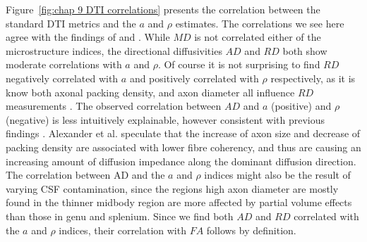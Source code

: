 Figure~\ref{fig:chap 9 DTI correlations} presents the correlation between the standard DTI metrics and the $a$ and $\rho$ estimates. The correlations we see here agree with the findings of \citep{Barazany:2009} and \citep{Alexander:2010}. While $MD$ is not correlated either of the microstructure indices, the directional diffusivities $AD$ and $RD$ both show moderate correlations with $a$ and $\rho$. Of course it is not surprising to find $RD$ negatively correlated with $a$ and positively correlated with $\rho$ respectively, as it is know both axonal packing density, and axon diameter all influence $RD$ measurements \citep{Beaulieu:2002}. The observed correlation between $AD$ and $a$ (positive) and $\rho$ (negative) is less intuitively explainable, however consistent with previous findings \citep{Barazany:2009,Alexander:2010}. Alexander et al. speculate that the increase of axon size and decrease of packing density are associated with lower fibre coherency, and thus are causing an increasing amount of diffusion impedance along the dominant diffusion direction. The correlation between AD and the $a$ and $\rho$ indices might also be the result of varying CSF contamination, since the regions high axon diameter are mostly found in the thinner midbody region are more affected by partial volume effects than those in genu and splenium. Since we find both $AD$ and $RD$ correlated with the $a$ and $\rho$ indices, their correlation with $FA$ follows by definition.  
\egroup %
\FloatBarrier
